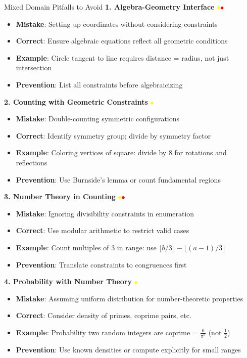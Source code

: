 \documentclass{article}
\begin{document}
\begin{trapbox}{Mixed Domain Pitfalls to Avoid}
\textbf{1. Algebra-Geometry Interface} \textcolor{yellow}{$\bullet$}\textcolor{red}{$\bullet$}
\begin{itemize}[nosep]
\item \textbf{Mistake}: Setting up coordinates without considering constraints
\item \textbf{Correct}: Ensure algebraic equations reflect all geometric conditions
\item \textbf{Example}: Circle tangent to line requires distance = radius, not just intersection
\item \textbf{Prevention}: List all constraints before algebraicizing
\end{itemize}

\textbf{2. Counting with Geometric Constraints} \textcolor{yellow}{$\bullet$}
\begin{itemize}[nosep]
\item \textbf{Mistake}: Double-counting symmetric configurations
\item \textbf{Correct}: Identify symmetry group; divide by symmetry factor
\item \textbf{Example}: Coloring vertices of square: divide by 8 for rotations and reflections
\item \textbf{Prevention}: Use Burnside's lemma or count fundamental regions
\end{itemize}

\textbf{3. Number Theory in Counting} \textcolor{yellow}{$\bullet$}\textcolor{red}{$\bullet$}
\begin{itemize}[nosep]
\item \textbf{Mistake}: Ignoring divisibility constraints in enumeration
\item \textbf{Correct}: Use modular arithmetic to restrict valid cases
\item \textbf{Example}: Count multiples of 3 in range: use $\lfloor b/3 \rfloor - \lfloor (a-1)/3 \rfloor$
\item \textbf{Prevention}: Translate constraints to congruences first
\end{itemize}

\textbf{4. Probability with Number Theory} \textcolor{yellow}{$\bullet$}
\begin{itemize}[nosep]
\item \textbf{Mistake}: Assuming uniform distribution for number-theoretic properties
\item \textbf{Correct}: Consider density of primes, coprime pairs, etc.
\item \textbf{Example}: Probability two random integers are coprime = $\frac{6}{\pi^2}$ (not $\frac{1}{2}$)
\item \textbf{Prevention}: Use known densities or compute explicitly for small ranges
\end{itemize}


\end{trapbox}
\end{document}
